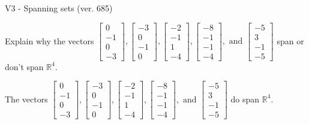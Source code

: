 \begin{exercise}
  \begin{exerciseTitle}V3 - Spanning sets (ver. 685)\end{exerciseTitle}
  \begin{exerciseStatement}
    Explain why the vectors \(\left[\begin{array}{r}
0 \\
-1 \\
0 \\
-3
\end{array}\right] , \left[\begin{array}{r}
-3 \\
0 \\
-1 \\
0
\end{array}\right] , \left[\begin{array}{r}
-2 \\
-1 \\
1 \\
-4
\end{array}\right] , \left[\begin{array}{r}
-8 \\
-1 \\
-1 \\
-4
\end{array}\right] , \text{ and } \left[\begin{array}{r}
-5 \\
3 \\
-1 \\
-5
\end{array}\right]\) span or don't span \(\mathbb{R}^4\). 
	


  \end{exerciseStatement}
  \begin{exerciseAnswer}
   The vectors \(\left[\begin{array}{r}
0 \\
-1 \\
0 \\
-3
\end{array}\right] , \left[\begin{array}{r}
-3 \\
0 \\
-1 \\
0
\end{array}\right] , \left[\begin{array}{r}
-2 \\
-1 \\
1 \\
-4
\end{array}\right] , \left[\begin{array}{r}
-8 \\
-1 \\
-1 \\
-4
\end{array}\right] , \text{ and } \left[\begin{array}{r}
-5 \\
3 \\
-1 \\
-5
\end{array}\right]\) 
  	 do  
	span \(\mathbb{R}^4\).
  



\end{exerciseAnswer}
\end{exercise}
